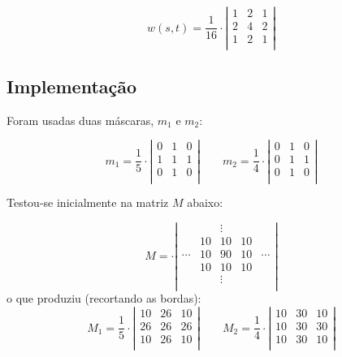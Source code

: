 \documentclass[10pt,a4paper]{article}
\begin{document}
\[ w(s,t) = \frac{1}{16} \cdot \left|
    \begin{array}{ccc}
        1 & 2 & 1 \\
        2 & 4 & 2 \\
        1 & 2 & 1 \\
\end{array}\right|\]

\subsection{Implementação}
Foram usadas duas máscaras, $m_1$ e $m_2$:

\[
    m_1 = \frac{1}{5} \cdot \left|
    \begin{array}{ccc}
        0 & 1 & 0 \\
        1 & 1 & 1 \\
        0 & 1 & 0 \\
    \end{array}\right|
    \qquad
    m_2 = \frac{1}{4} \cdot \left|
    \begin{array}{ccc}
        0 & 1 & 0 \\
        0 & 1 & 1 \\
        0 & 1 & 0 \\
    \end{array}\right|
\]

Testou-se inicialmente na matriz $M$ abaixo:

\[
    M = \cdot \left|
    \begin{array}{ccccc}
                &    & \vdots \\
                & 10 & 10 & 10 \\
        \cdots  & 10 & 90 & 10 & \cdots\\
                & 10 & 10 & 10 \\
                &    & \vdots \\
    \end{array}\right|
\]
o que produziu (recortando as bordas):
\[
    M_1 = \frac{1}{5} \cdot \left|
    \begin{array}{ccc}
        10 & 26 & 10 \\
        26 & 26 & 26 \\
        10 & 26 & 10 \\
    \end{array}\right|
    \qquad
    M_2 = \frac{1}{4} \cdot \left|
    \begin{array}{ccc}
        10 & 30 & 10 \\
        10 & 30 & 30 \\
        10 & 30 & 10 \\
    \end{array}\right|
\]
\end{document}
